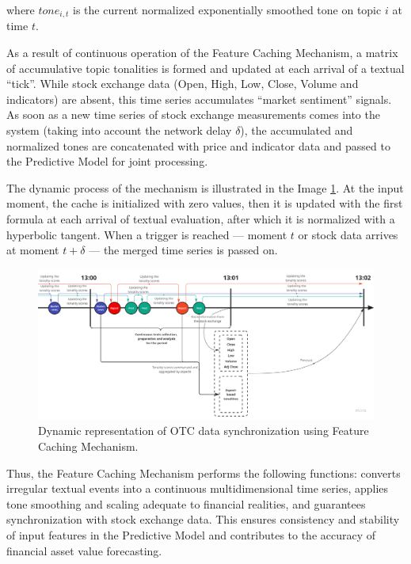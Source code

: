 where $tone_{i, t}$ is the current normalized exponentially smoothed tone on topic $i$ at time $t$.

As a result of continuous operation of the Feature Caching Mechanism, a matrix of accumulative topic tonalities
is formed and updated at each arrival of a textual “tick”. While stock exchange data (Open, High, Low, Close,
Volume and indicators) are absent, this time series accumulates “market sentiment” signals. As soon as a new
time series of stock exchange measurements comes into the system (taking into account the network delay $\delta$),
the accumulated and normalized tones are concatenated with price and indicator data and passed to the Predictive
Model for joint processing.

The dynamic process of the mechanism is illustrated in the Image \ref{fig:feature_caching_mechanism}. At the input
moment, the cache is initialized with zero values, then it is updated with the first formula at each arrival
of textual evaluation, after which it is normalized with a hyperbolic tangent. When a trigger is reached --- moment
$t$ or stock data arrives at moment $t+\delta$ --- the merged time series is passed on.

\begin{figure}[H]
    \centering
    \includegraphics[width=1\linewidth]{img/feature_caching_mechanism.png}
    \caption{Dynamic representation of OTC data synchronization using Feature Caching Mechanism.}
    \label{fig:feature_caching_mechanism}
\end{figure}

Thus, the Feature Caching Mechanism performs the following functions: converts irregular textual events
into a continuous multidimensional time series, applies tone smoothing and scaling adequate to financial
realities, and guarantees synchronization with stock exchange data. This ensures consistency and stability
of input features in the Predictive Model and contributes to the accuracy of financial asset value forecasting.

